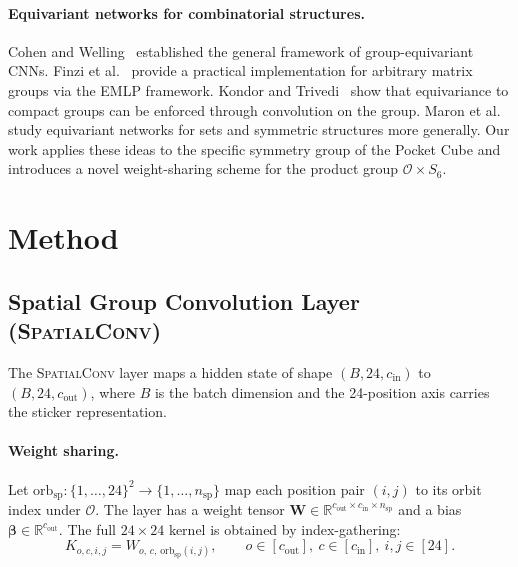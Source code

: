 \documentclass[11pt]{article}
\newcommand{\bW}{\mathbf{W}}
\newcommand{\orbsp}{\mathrm{orb}_{\mathrm{sp}}}
\newcommand{\R}{\mathbb{R}}
\begin{document}
\paragraph{Equivariant networks for combinatorial structures.}
Cohen and Welling~\cite{cohen2016group} established the general framework of
group-equivariant CNNs.
Finzi et al.~\cite{finzi2021practical} provide a practical implementation
for arbitrary matrix groups via the EMLP framework.
Kondor and Trivedi~\cite{kondor2018generalization} show that equivariance
to compact groups can be enforced through convolution on the group.
Maron et al.~\cite{maron2020learning} study equivariant networks for sets
and symmetric structures more generally.
Our work applies these ideas to the specific symmetry group of the Pocket
Cube and introduces a novel weight-sharing scheme for the product group
$\mathcal{O} \times S_6$.

\section{Method}
\label{sec:method}

\subsection{Spatial Group Convolution Layer (\textsc{SpatialConv})}
\label{sec:groupconv}

The \textsc{SpatialConv} layer maps a hidden state of shape
$(B, 24, c_{\mathrm{in}})$ to $(B, 24, c_{\mathrm{out}})$, where $B$
is the batch dimension and the 24-position axis carries the sticker
representation.

\paragraph{Weight sharing.}
Let $\orbsp: \{1,\ldots,24\}^2 \to \{1,\ldots,n_{\mathrm{sp}}\}$ map each
position pair $(i,j)$ to its orbit index under $\mathcal{O}$.
The layer has a weight tensor
$\bW \in \R^{c_{\mathrm{out}} \times c_{\mathrm{in}} \times n_{\mathrm{sp}}}$
and a bias $\boldsymbol{\beta} \in \R^{c_{\mathrm{out}}}$.
The full $24 \times 24$ kernel is obtained by index-gathering:
\begin{equation}
  K_{o, c, i, j} = W_{o,\, c,\, \orbsp(i, j)},
  \qquad
  o \in [c_{\mathrm{out}}],\ c \in [c_{\mathrm{in}}],\ i, j \in [24].
\end{equation}
\end{document}
